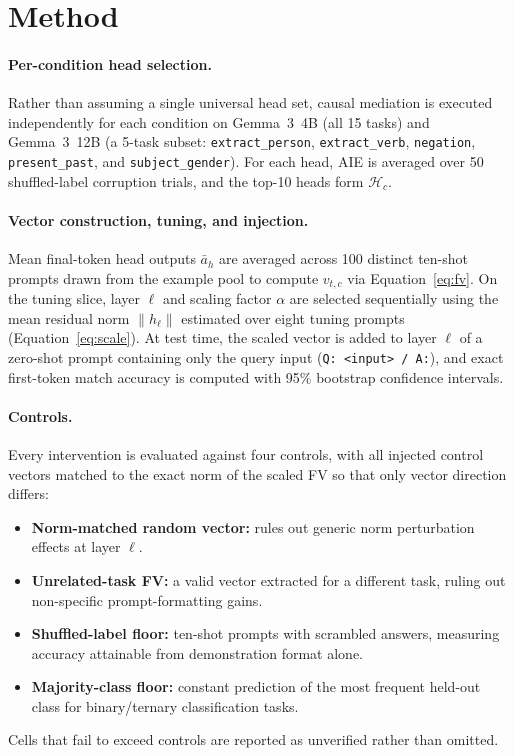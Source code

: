 \documentclass[11pt]{article}
\begin{document}
\section{Method}

\paragraph{Per-condition head selection.}
Rather than assuming a single universal head set, causal mediation is executed
independently for each condition on Gemma~3~4B (all 15 tasks) and Gemma~3~12B
(a 5-task subset: \texttt{extract\_person}, \texttt{extract\_verb},
\texttt{negation}, \texttt{present\_past}, and \texttt{subject\_gender}). For
each head, AIE is averaged over 50 shuffled-label corruption trials, and the
top-10 heads form $\mathcal{H}_c$.

\paragraph{Vector construction, tuning, and injection.}
Mean final-token head outputs $\bar{a}_h$ are averaged across 100 distinct
ten-shot prompts drawn from the example pool to compute $v_{t,c}$ via
Equation~\eqref{eq:fv}. On the tuning slice, layer $\ell$ and scaling factor
$\alpha$ are selected sequentially using the mean residual norm $\|h_\ell\|$
estimated over eight tuning prompts (Equation~\eqref{eq:scale}). At test time,
the scaled vector is added to layer $\ell$ of a zero-shot prompt containing
only the query input (\texttt{Q: <input> / A:}), and exact first-token match
accuracy is computed with 95\% bootstrap confidence intervals.

\paragraph{Controls.}
Every intervention is evaluated against four controls, with all injected
control vectors matched to the exact norm of the scaled FV so that only vector
direction differs:
\begin{itemize}
  \item \textbf{Norm-matched random vector:} rules out generic norm
    perturbation effects at layer $\ell$.
  \item \textbf{Unrelated-task FV:} a valid vector extracted for a different
    task, ruling out non-specific prompt-formatting gains.
  \item \textbf{Shuffled-label floor:} ten-shot prompts with scrambled answers,
    measuring accuracy attainable from demonstration format alone.
  \item \textbf{Majority-class floor:} constant prediction of the most
    frequent held-out class for binary/ternary classification tasks.
\end{itemize}
Cells that fail to exceed controls are reported as unverified rather than
omitted.
\end{document}
